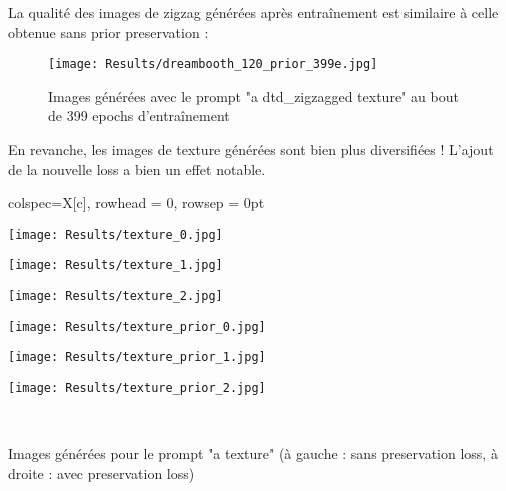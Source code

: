 \documentclass{article}
\begin{document}
La qualité des images de zigzag générées après entraînement est similaire à celle obtenue sans prior preservation :
\begin{figure}[H]
    \centering
    \texttt{[image: Results/dreambooth\_120\_prior\_399e.jpg]}
    \caption{Images générées avec le prompt "a dtd\_zigzagged texture" au bout de 399 epochs d'entraînement}
\end{figure}

En revanche, les images de texture générées sont bien plus diversifiées ! L'ajout de la nouvelle loss a bien un effet notable.
\begin{adjustwidth}{-3cm}{-3cm}
\begin{minipage}{1.0\linewidth}
    \begin{table}[H]
        \centering
        \begin{tblr}{colspec={X[c]},
        rowhead = 0,
        rowsep = 0pt
        }
        \begin{minipage}{3cm}
        \texttt{[image: Results/texture\_0.jpg]}
        \end{minipage}
        \hspace{-0.25cm}
        \begin{minipage}{3cm}
        \texttt{[image: Results/texture\_1.jpg]}
        \end{minipage}
        \hspace{-0.25cm}
        \begin{minipage}{3cm}
        \texttt{[image: Results/texture\_2.jpg]}
        \end{minipage}
        \begin{minipage}{3cm}
        \texttt{[image: Results/texture\_prior\_0.jpg]}
        \end{minipage}
        \hspace{-0.25cm}
        \begin{minipage}{3cm}
        \texttt{[image: Results/texture\_prior\_1.jpg]}
        \end{minipage}
        \hspace{-0.25cm}
        \begin{minipage}{3cm}
        \texttt{[image: Results/texture\_prior\_2.jpg]}
        \end{minipage}\\
        \end{tblr}
        \vspace{-0.2cm}
        \caption{Images générées pour le prompt "a texture" (à gauche : sans preservation loss, à droite : avec preservation loss)}
    \end{table}
\end{minipage}
\end{adjustwidth}
\end{document}
